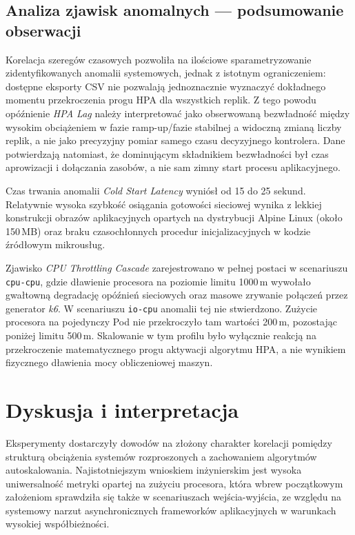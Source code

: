\subsection{Analiza zjawisk anomalnych — podsumowanie obserwacji}

Korelacja szeregów czasowych pozwoliła na ilościowe sparametryzowanie zidentyfikowanych anomalii systemowych, jednak z istotnym ograniczeniem: dostępne eksporty CSV nie pozwalają jednoznacznie wyznaczyć dokładnego momentu przekroczenia progu HPA dla wszystkich replik. Z tego powodu opóźnienie \textit{HPA Lag} należy interpretować jako obserwowaną bezwładność między wysokim obciążeniem w fazie ramp-up/fazie stabilnej a widoczną zmianą liczby replik, a nie jako precyzyjny pomiar samego czasu decyzyjnego kontrolera. Dane potwierdzają natomiast, że dominującym składnikiem bezwładności był czas aprowizacji i dołączania zasobów, a nie sam zimny start procesu aplikacyjnego.

Czas trwania anomalii \textit{Cold Start Latency} wyniósł od 15 do 25 sekund. Relatywnie wysoka szybkość osiągania gotowości sieciowej wynika z lekkiej konstrukcji obrazów aplikacyjnych opartych na dystrybucji Alpine Linux (około 150\,MB) oraz braku czasochłonnych procedur inicjalizacyjnych w kodzie źródłowym mikrousług.

Zjawisko \textit{CPU Throttling Cascade} zarejestrowano w pełnej postaci w scenariuszu \texttt{cpu-cpu}, gdzie dławienie procesora na poziomie limitu 1000\,m wywołało gwałtowną degradację opóźnień sieciowych oraz masowe zrywanie połączeń przez generator \textit{k6}. W scenariuszu \texttt{io-cpu} anomalii tej nie stwierdzono. Zużycie procesora na pojedynczy Pod nie przekroczyło tam wartości 200\,m, pozostając poniżej limitu 500\,m. Skalowanie w tym profilu było wyłącznie reakcją na przekroczenie matematycznego progu aktywacji algorytmu HPA, a nie wynikiem fizycznego dławienia mocy obliczeniowej maszyn.

\section{Dyskusja i interpretacja}

Eksperymenty dostarczyły dowodów na złożony charakter korelacji pomiędzy strukturą obciążenia systemów rozproszonych a zachowaniem algorytmów autoskalowania. Najistotniejszym wnioskiem inżynierskim jest wysoka uniwersalność metryki opartej na zużyciu procesora, która wbrew początkowym założeniom sprawdziła się także w scenariuszach wejścia-wyjścia, ze względu na systemowy narzut asynchronicznych frameworków aplikacyjnych w warunkach wysokiej współbieżności.

